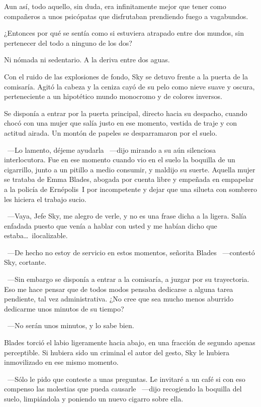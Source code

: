 Aun así, todo aquello, sin duda, era infinitamente mejor que tener como compañeros a unos psicópatas que disfrutaban prendiendo fuego a vagabundos.

¿Entonces por qué se sentía como si estuviera atrapado entre dos mundos, sin pertenecer del todo a ninguno de los dos?

Ni nómada ni sedentario. A la deriva entre dos aguas.

Con el ruido de las explosiones de fondo, Sky se detuvo frente a la puerta de la comisaría. Agitó la cabeza y la ceniza cayó de su pelo como nieve suave y oscura, perteneciente a un hipotético mundo monocromo y de colores inversos.

Se disponía a entrar por la puerta principal, directo hacia su despacho, cuando chocó con una mujer que salía justo en ese momento, vestida de traje y con actitud airada. Un montón de papeles se desparramaron por el suelo.

~---Lo lamento, déjeme ayudarla ~---dijo mirando a su aún silenciosa interlocutora. Fue en ese momento cuando vio en el suelo la boquilla de un cigarrillo, junto a un pitillo a medio consumir, y maldijo su suerte. Aquella mujer se trataba de Emma Blades, abogada por cuenta libre y empeñada en empapelar a la policía de Ernépolis~I por incompetente y dejar que una silueta con sombrero les hiciera el trabajo sucio.

~---Vaya, Jefe Sky, me alegro de verle, y no es una frase dicha a la ligera. Salía enfadada puesto que venía a hablar con usted y me habían dicho que estaba\dots\ ilocalizable.

~---De hecho no estoy de servicio en estos momentos, señorita Blades ~---contestó Sky, cortante.

~---Sin embargo se disponía a entrar a la comisaría, a juzgar por su trayectoria. Eso me hace pensar que de todos modos pensaba dedicarse a alguna tarea pendiente, tal vez administrativa. ¿No cree que sea mucho menos aburrido dedicarme unos minutos de su tiempo?

~---No serán unos minutos, y lo sabe bien.

Blades torció el labio ligeramente hacia abajo, en una fracción de segundo apenas perceptible. Si hubiera sido un criminal el autor del gesto, Sky le hubiera inmovilizado en ese mismo momento.

~---Sólo le pido que conteste a unas preguntas. Le invitaré a un café si con eso compenso las molestias que pueda causarle ~---dijo recogiendo la boquilla del suelo, limpiándola y poniendo un nuevo cigarro sobre ella.

